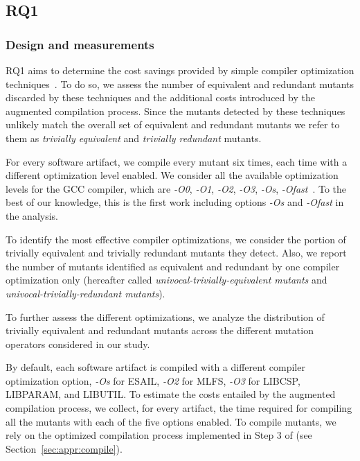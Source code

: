 \subsection{RQ1}




\subsubsection*{Design and measurements}

RQ1 aims to determine the cost savings provided by simple compiler optimization techniques~\cite{papadakis2015trivial,kintis2017detecting}. To do so, we assess the number of equivalent and redundant mutants discarded by these techniques and the additional costs introduced by the augmented compilation process. Since the mutants detected by these techniques unlikely match the overall set of equivalent and redundant mutants we refer to them as \emph{trivially equivalent} and \emph{trivially redundant} mutants.

For every software artifact, we compile every mutant six times, each time with a different optimization level enabled. We consider all the available optimization levels for the GCC compiler, which are \emph{-O0}, \emph{-O1}, \emph{-O2}, \emph{-O3}, \emph{-Os},
 \emph{-Ofast}~\cite{GCCopt}. To the best of our knowledge, this is the first work including options \emph{-Os} and
 \emph{-Ofast} in the analysis.
 

To identify the most effective compiler optimizations, we consider the portion of trivially equivalent and trivially redundant mutants they detect. Also, we report the number of mutants identified as equivalent and redundant  by one compiler optimization only (hereafter called \emph{univocal-trivially-equivalent mutants} and \emph{univocal-trivially-redundant mutants}). 

{To further assess the different optimizations, we analyze the distribution of trivially equivalent and redundant mutants across the different mutation operators considered in our study.}

{By default, each software artifact is compiled with a different compiler optimization option, \emph{-Os} for ESAIL, \emph{-O2} for MLFS, \emph{-O3} for LIBCSP, LIBPARAM, and LIBUTIL.}
To estimate the costs entailed by the augmented compilation process, we collect, for every artifact, the time required for compiling all the mutants with each of the five options enabled. To compile mutants, we rely on the optimized compilation process implemented in Step 3 of \APPR (see Section~\ref{sec:appr:compile}).

